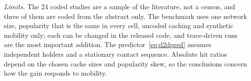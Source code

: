 \emph{Limits.} The 24 coded studies are a sample of the literature, not a census, and three of them are coded from the abstract only. The benchmark uses one network size, popularity that is the same in every cell, uncoded caching and synthetic mobility only; each can be changed in the released code, and trace-driven runs are the most important addition. The predictor~\eqref{eq:d2dpred} assumes independent holders and a stationary contact sequence. Absolute hit ratios depend on the chosen cache sizes and popularity skew, so the conclusions concern how the gain responds to mobility.
